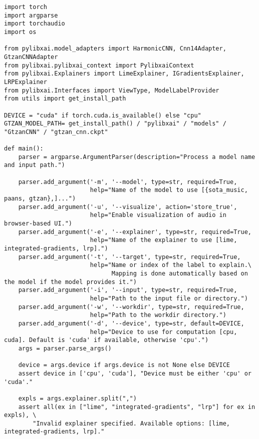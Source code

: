 \documentclass[
    bindingoffset=5mm,  %
    footnoteindent=3mm, %
    hyphenation=true    %
]{src/wut-thesis}
\begin{document}
 \label{appendix:ScriptListing}
\begin{verbatim}
import torch
import argparse
import torchaudio
import os

from pylibxai.model_adapters import HarmonicCNN, Cnn14Adapter, GtzanCNNAdapter
from pylibxai.pylibxai_context import PylibxaiContext
from pylibxai.Explainers import LimeExplainer, IGradientsExplainer, LRPExplainer
from pylibxai.Interfaces import ViewType, ModelLabelProvider
from utils import get_install_path

DEVICE = "cuda" if torch.cuda.is_available() else "cpu"
GTZAN_MODEL_PATH= get_install_path() / "pylibxai" / "models" / "GtzanCNN" / "gtzan_cnn.ckpt"

def main():
    parser = argparse.ArgumentParser(description="Process a model name and input path.")
    
    parser.add_argument('-m', '--model', type=str, required=True,
                        help="Name of the model to use [{sota_music, paans, gtzan},]...")
    parser.add_argument('-u', '--visualize', action='store_true',
                        help="Enable visualization of audio in browser-based UI.")
    parser.add_argument('-e', '--explainer', type=str, required=True,
                        help="Name of the explainer to use [lime, integrated-gradients, lrp].")
    parser.add_argument('-t', '--target', type=str, required=True,
                        help="Name or index of the label to explain.\
                              Mapping is done automatically based on the model if the model provides it.") 
    parser.add_argument('-i', '--input', type=str, required=True,
                        help="Path to the input file or directory.") 
    parser.add_argument('-w', '--workdir', type=str, required=True,
                        help="Path to the workdir directory.")
    parser.add_argument('-d', '--device', type=str, default=DEVICE,
                        help="Device to use for computation [cpu, cuda]. Default is 'cuda' if available, otherwise 'cpu'.")
    args = parser.parse_args()
    
    device = args.device if args.device is not None else DEVICE
    assert device in ['cpu', 'cuda'], "Device must be either 'cpu' or 'cuda'."
    
    expls = args.explainer.split(",")
    assert all(ex in ["lime", "integrated-gradients", "lrp"] for ex in expls), \
        "Invalid explainer specified. Available options: [lime, integrated-gradients, lrp]."


\end{verbatim}
\end{document}
